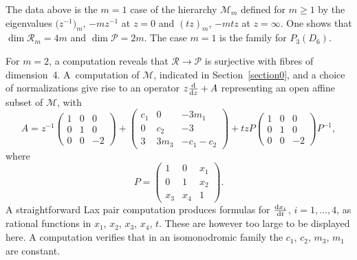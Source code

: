 \documentclass[10pt,a4paper]{amsart}
\numberwithin{equation}{section}
\begin{document}
The data above is the $m=1$ case of the hierarchy $\mathcal{M}_m$ defined for $m\geq 1$ by the eigenvalues
 $\bigl(z^{-1}\bigr)_m$, $-mz^{-1}$ at $z=0$ and $(tz)_m$, $-mtz$ at $z=\infty$. One shows that $\dim \mathcal{R}_m=4m$ and
 $\dim \mathcal{P}=2m$. The case $m=1$ is the family for $P_3(D_6)$.

 For $m=2$, a computation reveals that $\mathcal{R}\rightarrow \mathcal{P}$ is surjective with fibres of dimension~4. A~computation of $\mathcal{M}$, indicated in Section~\ref{section0},
and a choice of normalizations give rise to an operator $z\frac{{\rm d}}{{\rm d}z}+A$ representing an open affine subset of $\mathcal{M}$, with
 \[ A=z^{-1} \begin{pmatrix} 1&0 &0 \\ 0&1 & 0\\ 0&0 &-2 \end{pmatrix}+
\begin{pmatrix}c_1& 0&-3m_{1} \\ 0&c_2 & -3\\ 3& 3m_{3}&-c_1-c_2 \end{pmatrix}+
 tz P \begin{pmatrix} 1&0 &0 \\ 0&1 & 0\\ 0&0 &-2 \end{pmatrix}P^{-1} ,\]
where
\[
P=\left(\begin{matrix}1 &0 &x_1 \\ 0&1 &x_2 \\ x_3&x_4 & 1\end{matrix}\right).
\]
A straightforward Lax pair computation produces formulas for $\frac{{\rm d}x_i}{{\rm d}t}$, $i=1,\dots,4$, as rational functions in
$x_1$, $x_2$, $x_3$, $x_4$, $t$. These are however too large to be displayed here.
A computation verifies that in an isomonodromic family the $c_1$, $c_2$, $m_{3}$, $m_{1}$ are constant.
\end{document}
